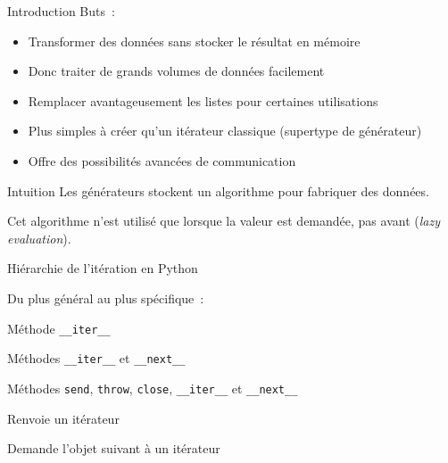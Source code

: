 \begin{frame}{Introduction}
  Buts~:

  \begin{itemize}[<+->]
    \item Transformer des données sans stocker le résultat en mémoire
    \item Donc traiter de grands volumes de données facilement
    \item Remplacer avantageusement les listes pour certaines utilisations
    \item Plus simples à créer qu'un itérateur classique (supertype de générateur)
    \item Offre des possibilités avancées de communication
  \end{itemize}
\end{frame}

\begin{frame}{Intuition}
  Les générateurs \alert{stockent un algorithme} pour fabriquer des données.

  Cet algorithme n'est utilisé \alert{que lorsque la valeur est demandée}, pas avant (\emph{lazy evaluation}).
\end{frame}

\begin{frame}{Hiérarchie de l'itération en Python}

  Du plus général au plus spécifique~:

  \begin{description}[<+->]
    \item[Iterable] Méthode \texttt{\_\_iter\_\_}
    \item[Iterator] Méthodes \texttt{\_\_iter\_\_} et \texttt{\_\_next\_\_}
    \item[Generator] Méthodes \texttt{send}, \texttt{throw}, \texttt{close}, \texttt{\_\_iter\_\_} et \texttt{\_\_next\_\_}
  \end{description}  


  \begin{description}[<+->]
    \item[\texttt{\_\_iter\_\_}] Renvoie un itérateur
    \item[\texttt{\_\_next\_\_}] Demande l'objet suivant à un itérateur
  \end{description}

\end{frame}

